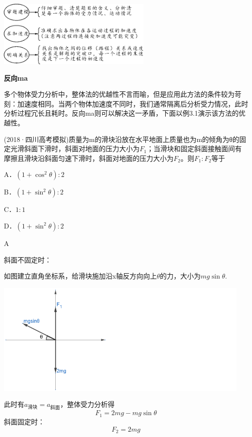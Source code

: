 \documentclass[cn,10.5pt,chinese,mac,chinesefont=founder]{elegantbook}
\begin{document}
\begin{center}\includegraphics[width=3in,height=1.29167in]{media/image133.png}\end{center}
\newpage
\begin{problemset}
	\item \textbf{反向ma}
	
	\qquad 多个物体受力分析中，整体法的优越性不言而喻，但是应用此方法的条件较为苛刻：加速度相同。当两个物体加速度不同时，我们通常隔离后分析受力情况，此时分析过程冗长且耗时。反向ma则可以解决这一矛盾，下面以例3.1演示该方法的优越性。
	\begin{example}
		(2018·四川高考模拟)质量为m的滑块沿放在水平地面上质量也为m的倾角为θ的固定光滑斜面下滑时，斜面对地面的压力大小为$F_1$；当滑块和固定斜面接触面间有摩擦且滑块沿斜面匀速下滑时，斜面对地面的压力大小为$F_2$。则$F_1:F_2$等于
		
		    A．$(1+\cos^2\theta):2$
    		
    		B．$(1+\sin^2\theta):2$  
    
    		C．$1:1    $     
    
    		D．$(1+\sin^2\theta):2$ 
    		\begin{solution}A
    		
    		斜面不固定时：
    		
			如图建立直角坐标系，给滑块施加沿x轴反方向向上$\theta$的力，大小为$mg\sin\theta$.
\begin{center}
	\includegraphics[width=5in]{media/31.png}
\end{center}

				此时有$a_{\text{滑块}}=a_{\text{斜面}}$，整体受力分析得
			\begin{equation}
				F_1=2mg-mg\sin\theta
			\end{equation}
			斜面固定时：
			\begin{equation}
				F_2=2mg
			\end{equation}
			

\end{solution}
\end{example}
\end{problemset}
\end{document}
